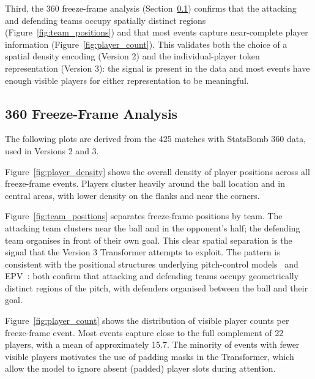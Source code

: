 Third, the 360 freeze-frame analysis (Section~\ref{sec:eda_360}) confirms that the attacking and defending teams occupy spatially distinct regions (Figure~\ref{fig:team_positions}) and that most events capture near-complete player information (Figure~\ref{fig:player_count}). This validates both the choice of a spatial density encoding (Version 2) and the individual-player token representation (Version 3): the signal is present in the data and most events have enough visible players for either representation to be meaningful.


\subsection{360 Freeze-Frame Analysis}\label{sec:eda_360}

The following plots are derived from the 425 matches with StatsBomb 360 data, used in Versions 2 and 3.

Figure~\ref{fig:player_density} shows the overall density of player positions across all freeze-frame events. Players cluster heavily around the ball location and in central areas, with lower density on the flanks and near the corners.


Figure~\ref{fig:team_positions} separates freeze-frame positions by team. The attacking team clusters near the ball and in the opponent's half; the defending team organises in front of their own goal. This clear spatial separation is the signal that the Version 3 Transformer attempts to exploit. The pattern is consistent with the positional structures underlying pitch-control models~\cite{spearman2018} and EPV~\cite{fernandez2019epv}: both confirm that attacking and defending teams occupy geometrically distinct regions of the pitch, with defenders organised between the ball and their goal.


Figure~\ref{fig:player_count} shows the distribution of visible player counts per freeze-frame event. Most events capture close to the full complement of 22 players, with a mean of approximately 15.7. The minority of events with fewer visible players motivates the use of padding masks in the Transformer, which allow the model to ignore absent (padded) player slots during attention.

